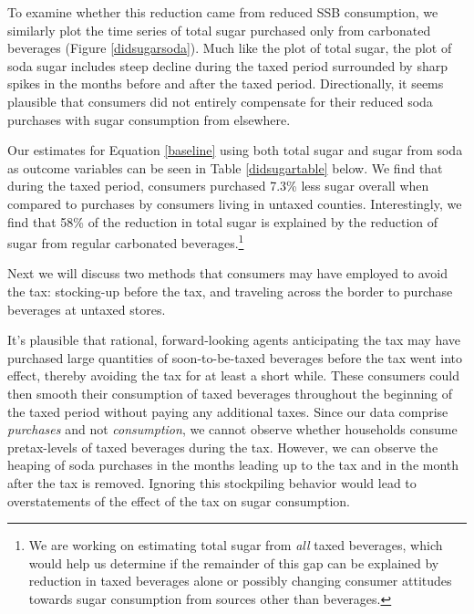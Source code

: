 \documentclass[12pt]{article}
\begin{document}
To examine whether this reduction came from reduced SSB consumption, we similarly plot the time series of total sugar purchased only from carbonated beverages (Figure \ref{didsugarsoda}). Much like the plot of total sugar, the plot of soda sugar includes steep decline during the taxed period surrounded by sharp spikes in the months before and after the taxed period. Directionally, it seems plausible that consumers did not entirely compensate for their reduced soda purchases with sugar consumption from elsewhere.

Our estimates for Equation \ref{baseline} using both total sugar and sugar from soda as outcome variables can be seen in Table \ref{didsugartable} below. We find that during the taxed period, consumers purchased 7.3\% less sugar overall when compared to purchases by consumers living in untaxed counties. Interestingly, we find that 58\% of the reduction in total sugar is explained by the reduction of sugar from regular carbonated beverages.\footnote{We are working on estimating total sugar from \textit{all} taxed beverages, which would help us determine if the remainder of this gap can be explained by reduction in taxed beverages alone or possibly changing consumer attitudes towards sugar consumption from sources other than beverages.} %

Next we will discuss two methods that consumers may have employed to avoid the tax: stocking-up before the tax, and traveling across the border to purchase beverages at untaxed stores.

It's plausible that rational, forward-looking agents anticipating the tax may have purchased large quantities of soon-to-be-taxed beverages before the tax went into effect, thereby avoiding the tax for at least a short while. These consumers could then smooth their consumption of taxed beverages throughout the beginning of the taxed period without paying any additional taxes. Since our data comprise \textit{purchases} and not \textit{consumption}, we cannot observe whether households consume pretax-levels of taxed beverages during the tax. However, we can observe the heaping of soda purchases in the months leading up to the tax and in the month after the tax is removed. Ignoring this stockpiling behavior would lead to overstatements of the effect of the tax on sugar consumption.
\end{document}
